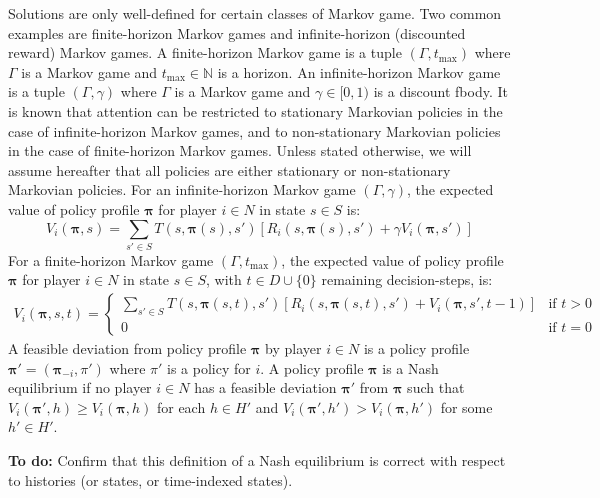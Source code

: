 \documentclass[10pt]{article}
\theoremstyle{plain}
\newcommand{\vect}[1]{\bm{#1}}
\newenvironment{note}[1][Note]{
    \begin{center}
    	\begin{minipage}{0.9\linewidth}
    		\begin{mdframed}[backgroundcolor=yellow!25,linewidth=0pt]
    			\textbf{#1:} }{
    		\end{mdframed}
    	\end{minipage}
    \end{center}
}
\begin{document}
Solutions are only well-defined for certain classes of Markov game.
Two common examples are finite-horizon Markov games and infinite-horizon (discounted reward) Markov games.
A finite-horizon Markov game is a tuple $(\Gamma, t_{\max})$ where $\Gamma$ is a Markov game and $t_{\max} \in \mathbb{N}$ is a horizon.
An infinite-horizon Markov game is a tuple $(\Gamma, \gamma)$ where $\Gamma$ is a Markov game and $\gamma \in [0, 1)$ is a discount fbody.
It is known that attention can be restricted to stationary Markovian policies in the case of infinite-horizon Markov games, and to non-stationary Markovian policies in the case of finite-horizon Markov games.
Unless stated otherwise, we will assume hereafter that all policies are either stationary or non-stationary Markovian policies.
For an infinite-horizon Markov game $(\Gamma, \gamma)$, the expected value of policy profile $\vect{\pi}$ for player $i \in N$ in state $s \in S$ is:
\begin{equation*}
    V_{i}(\vect{\pi}, s) = \sum_{s' \in S} T(s, \vect{\pi}(s), s') \left[ R_{i}(s, \vect{\pi}(s), s') + \gamma V_{i}(\vect{\pi}, s') \right]
\end{equation*}
For a finite-horizon Markov game $(\Gamma, t_{\max})$, the expected value of policy profile $\vect{\pi}$ for player $i \in N$ in state $s \in S$, with $t \in D \cup \{ 0 \}$ remaining decision-steps, is:
\begin{align*}
    V_{i}(\vect{\pi}, s, t) =
    \begin{cases}
        \sum\limits_{s' \in S} T(s, \vect{\pi}(s, t), s') \left[ R_{i}(s, \vect{\pi}(s, t), s') + V_{i}(\vect{\pi}, s', t-1) \right] & \text{if $t > 0$} \\
        0 & \text{if $t = 0$}
    \end{cases}
\end{align*}
A feasible deviation from policy profile $\vect{\pi}$ by player $i \in N$ is a policy profile $\vect{\pi'} = (\vect{\pi}_{-i}, \pi')$ where $\pi'$ is a policy for $i$.
A policy profile $\vect{\pi}$ is a Nash equilibrium if no player $i \in N$ has a feasible deviation $\vect{\pi'}$ from $\vect{\pi}$ such that $V_{i}(\vect{\pi'}, h) \ge V_{i}(\vect{\pi}, h)$ for each $h \in H'$ and $V_{i}(\vect{\pi'}, h') > V_{i}(\vect{\pi}, h')$ for some $h' \in H'$.

\begin{note}[To do]
    Confirm that this definition of a Nash equilibrium is correct with respect to histories (or states, or time-indexed states).
\end{note}
\end{document}
